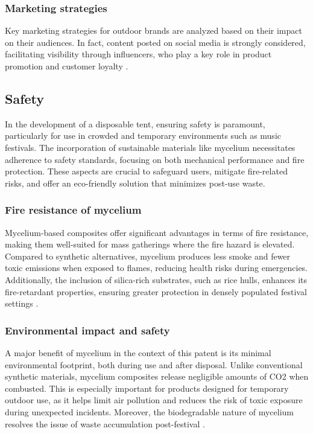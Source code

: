 \documentclass{article}
\begin{document}
\subsubsection{Marketing strategies}
Key marketing strategies for outdoor brands are analyzed based on their impact on their
audiences. In fact, content posted on social media is strongly considered, facilitating
visibility through influencers, who play a key role in product promotion and customer
loyalty \parencite{guestcolumn2024}.

\newpage
\subsection{Safety}
In the development of a disposable tent, ensuring safety is paramount, particularly for
use in crowded and temporary environments such as music festivals. The incorporation of
sustainable materials like mycelium necessitates adherence to safety standards, focusing
on both mechanical performance and fire protection. These aspects are crucial to safeguard
users, mitigate fire-related risks, and offer an eco-friendly solution that minimizes
post-use waste.

\subsubsection{Fire resistance of mycelium}
Mycelium-based composites offer significant advantages in terms of fire resistance, making
them well-suited for mass gatherings where the fire hazard is elevated. Compared to
synthetic alternatives, mycelium produces less smoke and fewer toxic emissions when
exposed to flames, reducing health risks during emergencies. Additionally, the inclusion
of silica-rich substrates, such as rice hulls, enhances its fire-retardant properties,
ensuring greater protection in densely populated festival settings
\parencite{jonesThermalDegradationFire2018}.

\subsubsection{Environmental impact and safety}
A major benefit of mycelium in the context of this patent is its minimal environmental
footprint, both during use and after disposal. Unlike conventional synthetic materials,
mycelium composites release negligible amounts of CO2 when combusted. This is especially
important for products designed for temporary outdoor use, as it helps limit air pollution
and reduces the risk of toxic exposure during unexpected incidents. Moreover, the
biodegradable nature of mycelium resolves the issue of waste accumulation post-festival
\parencite{madusankaReviewRecentAdvances2024}.
\end{document}
